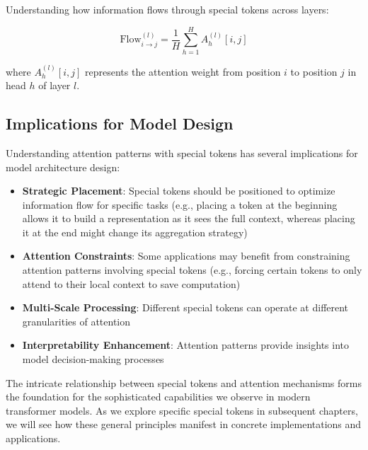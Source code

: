 Understanding how information flows through special tokens across layers:

\begin{equation}
\text{Flow}_{i \rightarrow j}^{(l)} = \frac{1}{H} \sum_{h=1}^{H} A_h^{(l)}[i,j]
\end{equation}

where $A_h^{(l)}[i,j]$ represents the attention weight from position $i$ to position $j$ in head $h$ of layer $l$.

\subsection{Implications for Model Design}

Understanding attention patterns with special tokens has several implications for model architecture design:

\begin{itemize}
\item \textbf{Strategic Placement}: Special tokens should be positioned to optimize information flow for specific tasks (e.g., placing a \cls{} token at the beginning allows it to build a representation as it sees the full context, whereas placing it at the end might change its aggregation strategy)
\item \textbf{Attention Constraints}: Some applications may benefit from constraining attention patterns involving special tokens (e.g., forcing certain tokens to only attend to their local context to save computation)
\item \textbf{Multi-Scale Processing}: Different special tokens can operate at different granularities of attention
\item \textbf{Interpretability Enhancement}: Attention patterns provide insights into model decision-making processes
\end{itemize}
\begin{comment}
Feedback: This is a good list of implications. To make it more concrete, you could add a brief example for one or two of the points. For "Strategic Placement," you could add: "(e.g., placing a [CLS] token at the beginning of the sequence allows it to build a representation as it sees the full context, whereas placing it at the end might change its aggregation strategy)." For "Attention Constraints," you could mention: "(e.g., forcing certain tokens to only attend to their local context to save computation)."

STATUS: addressed - added concrete examples for Strategic Placement and Attention Constraints
\end{comment}

The intricate relationship between special tokens and attention mechanisms forms the foundation for the sophisticated capabilities we observe in modern transformer models. As we explore specific special tokens in subsequent chapters, we will see how these general principles manifest in concrete implementations and applications.
